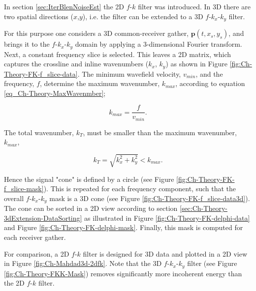 In section \ref{sec:IterBlenNoiseEst} the 2D $f$-$k$ filter was introduced. In 3D there are two spatial directions ($x$,$y$), i.e. the filter can be extended to a 3D $f$-$k_x$-$k_y$ filter.

For this purpose one considers a 3D common-receiver gather, $\mathbf{p}(t,x_s,y_s)$, and brings it to the $f$-$k_x$-$k_y$ domain by applying a 3-dimensional Fourier transform. Next, a constant frequency slice is selected. This leaves a 2D matrix, which captures the crossline and inline wavenumbers ($k_x$, $k_y$) as shown in Figure \ref{fig:Ch-Theory-FK-f_slice-data}. The minimum wavefield velocity, $v_{min}$, and the frequency, $f$, determine the maximum wavenumber, $k_{max}$, according to equation \ref{eq_Ch-Theory-MaxWavenmber};

\begin{equation}
	k_{max} = \frac{f}{v_{min}}.
	\label{eq_Ch-Theory-MaxWavenmber-Repetition}
\end{equation} 

The total wavenumber, $k_{T}$, must be smaller than the maximum wavenumber, $k_{max}$,

\begin{equation}
	k_{T} = \sqrt{k_x^2 + k_{y}^2} < k_{max}.
	\label{eq:Ch-Theory-TotalWavenumber}
\end{equation}

Hence the signal "cone" is defined by a circle (see Figure \ref{fig:Ch-Theory-FK-f_slice-mask}). This is repeated for each frequency component, such that the overall $f$-$k_x$-$k_y$ mask is a 3D cone (see Figure \ref{fig:Ch-Theory-FK-f_slice-data3d}). The cone can be sorted in a 2D view according to section \ref{sec:Ch-Theory-3dExtension-DataSorting} as illustrated in Figure \ref{fig:Ch-Theory-FK-delphi-data} and Figure \ref{fig:Ch-Theory-FK-delphi-mask}. Finally, this mask is computed for each receiver gather.

For comparison, a 2D $f$-$k$ filter is designed for 3D data and plotted in a 2D view in Figure \ref{fig:Ch-Mahdad3d-2dfk}. Note that the 3D $f$-$k_x$-$k_y$ filter (see Figure \ref{fig:Ch-Theory-FKK-Mask}) removes significantly more incoherent energy than the 2D $f$-$k$ filter. 


